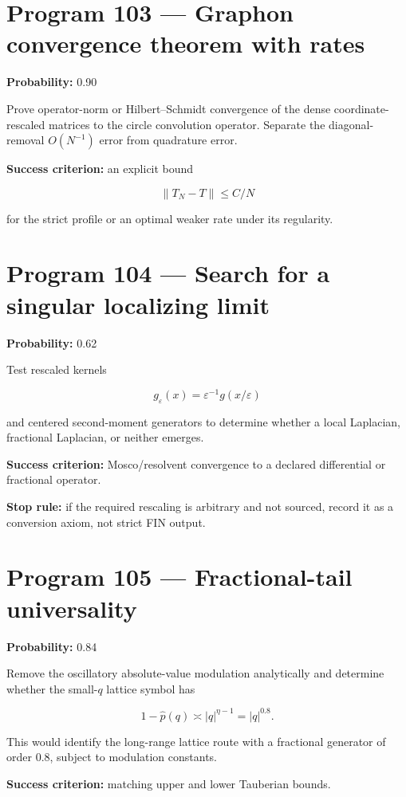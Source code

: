 \documentclass[11pt,a4paper,openany]{report}
\begin{document}
\section{Program 103 --- Graphon convergence theorem with rates}

\textbf{Probability:} 0.90

Prove operator-norm or Hilbert--Schmidt convergence of the dense coordinate-rescaled matrices to the circle convolution operator. Separate the diagonal-removal \(O(N^{-1})\) error from quadrature error.

\textbf{Success criterion:} an explicit bound

\[
\|T_N-T\|\le C/N
\]

for the strict profile or an optimal weaker rate under its regularity.

\section{Program 104 --- Search for a singular localizing limit}

\textbf{Probability:} 0.62

Test rescaled kernels

\[
g_\varepsilon(x)
=
\varepsilon^{-1}g(x/\varepsilon)
\]

and centered second-moment generators to determine whether a local Laplacian, fractional Laplacian, or neither emerges.

\textbf{Success criterion:} Mosco/\allowbreak{}resolvent convergence to a declared differential or fractional operator.

\textbf{Stop rule:} if the required rescaling is arbitrary and not sourced, record it as a conversion axiom, not strict FIN output.

\section{Program 105 --- Fractional-tail universality}

\textbf{Probability:} 0.84

Remove the oscillatory absolute-value modulation analytically and determine whether the small-\(q\) lattice symbol has

\[
1-\widehat p(q)\asymp |q|^{\eta-1}=|q|^{0.8}.
\]

This would identify the long-range lattice route with a fractional generator of order \(0.8\), subject to modulation constants.

\textbf{Success criterion:} matching upper and lower Tauberian bounds.
\end{document}
